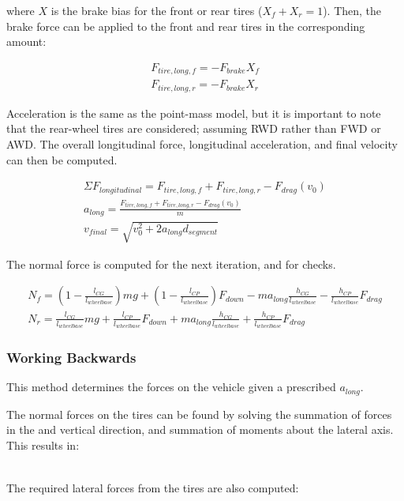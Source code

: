 \documentclass{article}
\begin{document}
where $X$ is the brake bias for the front or rear tires ($X_f + X_r = 1$). Then, the brake force can be applied to the front and rear tires in the corresponding amount:

\begin{align}
	F_{tire,long,f} = - F_{brake} X_{f} \\
	F_{tire,long,r} = - F_{brake} X_{r}
\end{align}

Acceleration is the same as the point-mass model, but it is important to note that the rear-wheel tires are considered; assuming RWD rather than FWD or AWD. The overall longitudinal force, longitudinal acceleration, and final velocity can then be computed.

\begin{align}
	\Sigma F_{longitudinal} = F_{tire,long,f} + F_{tire,long,r} - F_{drag}(v_0) \\
	a_{long} = \frac{ F_{tire,long,f} + F_{tire,long,r} - F_{drag}(v_0)}{m} \\
	v_{final} = \sqrt{v_0^2 + 2 a_{long} d_{segment}}
\end{align}

The normal force is computed for the next iteration, and for checks.

\begin{align}
	N_f = (1 - \frac{l_{CG}}{l_{wheelbase}}) m g 
			+ (1 - \frac{l_{CP}}{l_{wheelbase}}) F_{down}
			- m a_{long} \frac{h_{CG}}{l_{wheelbase}} 
			- \frac{h_{CP}}{l_{wheelbase}} F_{drag} \\
	N_r = \frac{l_{CG}}{l_{wheelbase}} m g 
			+ \frac{l_{CP}}{l_{wheelbase}} F_{down}
			+ m a_{long} \frac{h_{CG}}{l_{wheelbase}} 
			+ \frac{h_{CP}}{l_{wheelbase}} F_{drag}
\end{align}

\subsubsection{Working Backwards}
This method determines the forces on the vehicle given a prescribed $a_{long}$.

The normal forces on the tires can be found by solving the summation of forces in the and vertical direction, and summation of moments about the lateral axis. This results in:

\begin{align}
\end{align}

The required lateral forces from the tires are also computed:
\end{document}
